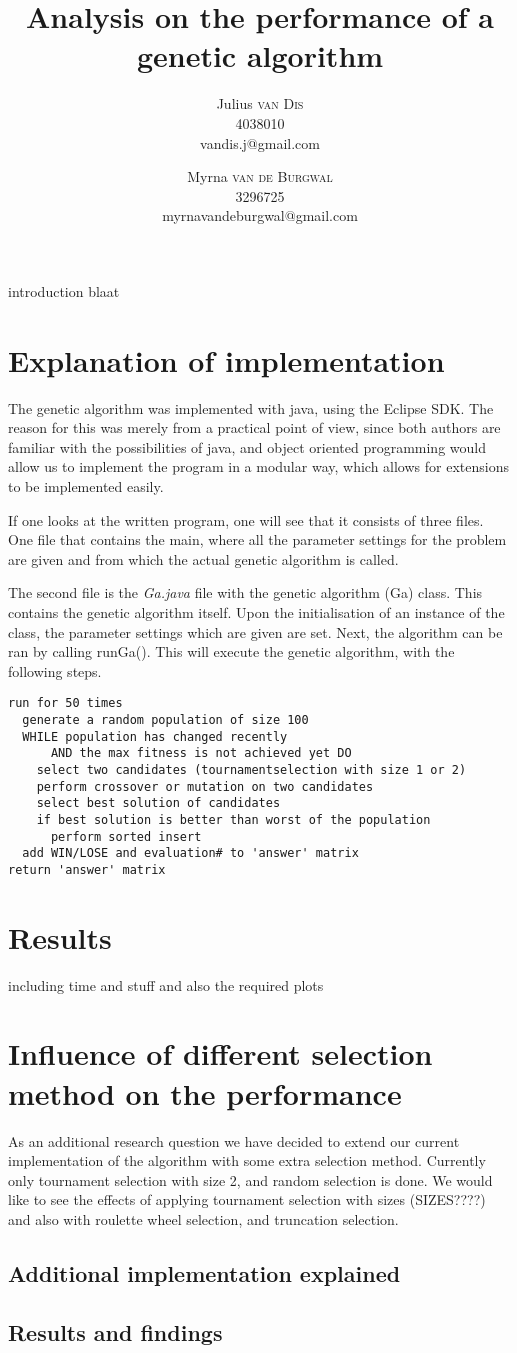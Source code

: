 \documentclass[10pt,a4paper,onecolumn]{article}
\title{Analysis on the performance of a genetic algorithm}
\author{Julius \textsc{van Dis} \\ 4038010 \\vandis.j@gmail.com
\and Myrna \textsc{van de Burgwal} \\ 3296725 \\myrnavandeburgwal@gmail.com}
\begin{document}
\maketitle
\thispagestyle{empty}

introduction blaat


\section{Explanation of implementation}
The genetic algorithm was implemented with java, using the Eclipse SDK. The reason for this was merely from a practical point of view, since both authors are familiar with the possibilities of java, and object oriented programming would allow us to implement the program in a modular way, which allows for extensions to be implemented easily.

If one looks at the written program, one will see that it consists of three files. One file that contains the main, where all the parameter settings for the problem are given and from which the actual genetic algorithm is called.

The second file is the \textit{Ga.java} file with the genetic algorithm (Ga) class. This contains the genetic algorithm itself. Upon the initialisation of an instance of the class, the parameter settings which are given are set. Next, the algorithm can be ran by calling runGa(). This will execute the genetic algorithm, with the following steps.

\begin{verbatim}
run for 50 times
  generate a random population of size 100
  WHILE population has changed recently 
      AND the max fitness is not achieved yet DO
    select two candidates (tournamentselection with size 1 or 2)
    perform crossover or mutation on two candidates
    select best solution of candidates
    if best solution is better than worst of the population
      perform sorted insert
  add WIN/LOSE and evaluation# to 'answer' matrix
return 'answer' matrix
\end{verbatim}




\section{Results}
including time and stuff
and also the required plots

\section{Influence of different selection method on the performance}
As an additional research question we have decided to extend our current implementation of the algorithm with some extra selection method. Currently only tournament selection with size 2, and random selection is done. We would like to see the effects of applying tournament selection with sizes (SIZES????) and also with roulette wheel selection, and truncation selection.

\subsection{Additional implementation explained}

\subsection{Results and findings}
\end{document}
